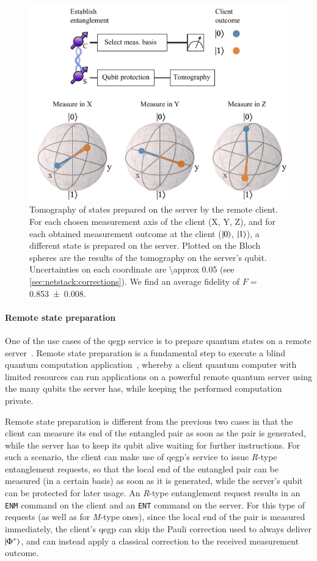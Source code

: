 \begin{figure}[t]
    \centering
    \includegraphics[width=0.6\linewidth]{figures/rsprep.pdf}
    \caption{
        Tomography of states prepared on the server by the remote client. For each chosen
        measurement axis of the client (X, Y, Z), and for each obtained measurement outcome at the
        client ($\ket{0}$, $\ket{1}$), a different state is prepared on the server. Plotted on the
        Bloch spheres are the results of the tomography on the server's qubit. Uncertainties on each
        coordinate are \num{\approx 0.05} (see \cref{sec:netstack:corrections}). We find an average
        fidelity of $F =$ \num{0.853(8)}.
    }
    \label{fig:rsprep}
\end{figure}

\paragraph{Remote state preparation}

One of the use cases of the \acrshort{qegp} service is to prepare quantum states on a remote
server~\cite{dahlberg_2019_egp}. Remote state preparation is a fundamental step to execute a blind
quantum computation application~\cite{broadbent_2009_ubqc}, whereby a client quantum computer with
limited resources can run applications on a powerful remote quantum server using the many qubits the
server has, while keeping the performed computation private.

Remote state preparation is different from the previous two cases in that the client can measure its
end of the entangled pair as soon as the pair is generated, while the server has to keep its qubit
alive waiting for further instructions. For such a scenario, the client can make use of
\acrshort{qegp}'s service to issue \emph{R}-type entanglement requests, so that the local end of the
entangled pair can be measured (in a certain basis) as soon as it is generated, while the server's
qubit can be protected for later usage. An \emph{R}-type entanglement request results in an
\texttt{ENM} command on the client and an \texttt{ENT} command on the server. For this type of
requests (as well as for \emph{M}-type ones), since the local end of the pair is measured
immediately, the client's \acrshort{qegp} can skip the Pauli correction used to always deliver
$\ket{\Phi^+}$, and can instead apply a classical correction to the received measurement outcome.

